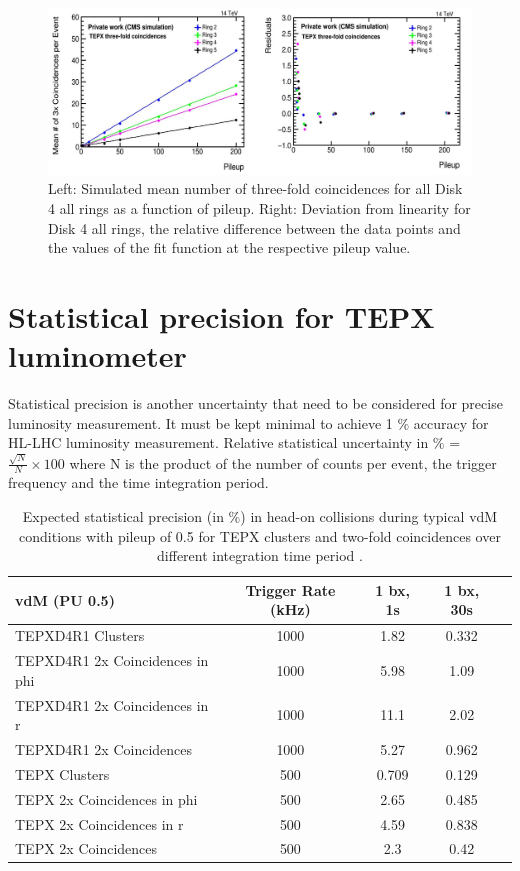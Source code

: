 \begin{figure}[H]
  \centering
  \includegraphics[width=1\columnwidth]{ashish_thesis/TEPX_threefold_linearity.png}
  \caption[Disk 4 all rings Three-Fold Coincidences Linearity]{Left: Simulated mean number of three-fold coincidences for all Disk 4 all rings as a function
    of pileup. Right: Deviation from linearity for Disk 4 all rings, the relative difference between the data points and the values of the fit function at the respective pileup value.}
  \label{fig:tepx_3foldcoin_allPU_3}
\end{figure}

\newpage
\section{Statistical precision for TEPX luminometer}

Statistical precision is another uncertainty that need to be considered for precise luminosity measurement. It must be kept minimal to achieve 1 $\%$ accuracy for HL-LHC luminosity measurement. Relative statistical uncertainty in $\%$ = $\frac{\sqrt{N}}{N} \times 100$ where N is the product of the number of counts per event, the trigger frequency and the time integration period.\\

\begin{table}[htbp]
  \centering
  \caption[Expected stat. precision of TEPX under low pileup] {Expected statistical precision (in $\%$) in head-on collisions during typical vdM conditions with pileup of 0.5 for TEPX clusters and two-fold coincidences over different integration time period \cite{Collaboration:2759074}.}
\begin{tabular}{lcccc}
vdM (PU 0.5) & Trigger Rate (kHz) & 1 bx, 1s & 1 bx, 30s\\
\hline
TEPXD4R1 Clusters&1000&1.82&0.332\\
TEPXD4R1 2x Coincidences in phi &1000&5.98&1.09\\
TEPXD4R1 2x Coincidences in r &1000&11.1&2.02\\
TEPXD4R1 2x Coincidences &1000&5.27&0.962\\
TEPX Clusters&500&0.709&0.129\\
TEPX 2x Coincidences in phi &500&2.65&0.485\\
TEPX 2x Coincidences in r &500&4.59&0.838\\
TEPX 2x Coincidences &500&2.3&0.42\\
\end{tabular}
\end{table}


